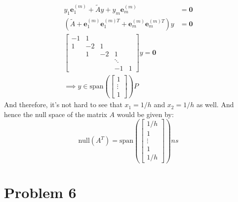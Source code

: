 \documentclass[]{article}
\begin{document}
        \begin{align*}\tag{5.3}\label{eqn:5.3}
            y_1 \mathbf{e}_1^{(m)} + \tilde{A}y + y_m \mathbf{e}_m^{(m)} 
            &= \mathbf{0}
            \\
            (\tilde{A} + \mathbf{e}^{(m)}_1\mathbf{e}^{(m)T}_1 + \mathbf{e}_m^{(m)}\mathbf{e}_m^{(m)T}) y &= \mathbf{0}
            \\
            \begin{bmatrix}
                -1 & 1 & & \\
                1 & -2 & 1 & \\
                & 1& -2& 1 \\
                & & & \ddots & \\
                & & & -1&1 
            \end{bmatrix} y = \mathbf{0}
            \\
            \implies
            y \in \text{span}\left(
                \begin{bmatrix}
                    1 \\ \vdots \\ 1
                \end{bmatrix}
            \right)P
        \end{align*}
        And therefore, it's not hard to see that $x_1 = 1/h$ and $x_2 = 1/h$ as well. And hence the null space of the matrix $A$ would be given by: 
        $$
            \text{null}(A^T) = \text{span}\left(
                \begin{bmatrix}
                    1/h \\ 1 \\ \vdots \\ 1 \\ 1/h
                \end{bmatrix}
            \right)ns
        $$
\section*{Problem 6}
\end{document}
